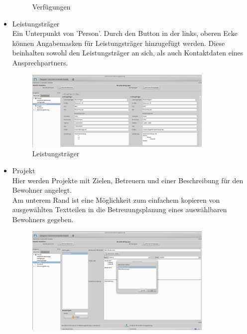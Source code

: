\begin{itemize}
\begin{figure}[h!]
\begin{center}
			\caption{Verfügungen}
		\end{center}
	\end{figure}
	\FloatBarrier
	\item Leistungsträger\mbox{}\\
	\noindent
	Ein Unterpunkt von 'Person'. Durch den Button in der links, oberen Ecke können Angabemasken für Leistungsträger hinzugefügt werden. Diese beinhalten sowohl den Leistungsträger an sich, als auch Kontaktdaten eines Ansprechpartners.
	\begin{figure}[h!]
		\begin{center}
			\includegraphics[keepaspectratio=true, width=0.85\textwidth]{pics/client_leistungstraeger.png}
			\caption{Leistungsträger}
		\end{center}
	\end{figure}
	\FloatBarrier
	\newpage
	\item Projekt\mbox{}\\
	\noindent
	Hier werden Projekte mit Zielen, Betreuern und einer Beschreibung für den Bewohner angelegt.\\Am unterem Rand ist eine Möglichkeit zum einfachem kopieren von ausgewählten Textteilen in die Betreuungsplanung eines auswählbaren Bewohners gegeben.
	\begin{figure}[h!]
		\begin{center}
			\includegraphics[keepaspectratio=true, width=0.85\textwidth]{pics/client_projekt.png}

\end{center}
\end{figure}
\end{itemize}
